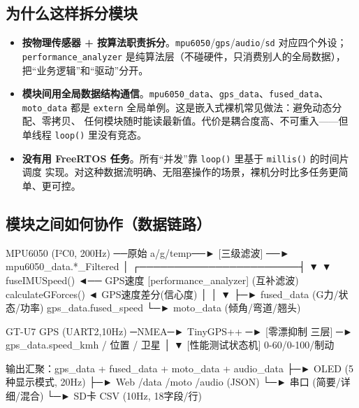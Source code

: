 \documentclass[UTF8,11pt,a4paper]{ctexart}
\begin{document}
\subsection{为什么这样拆分模块}
\begin{itemize}
  \item \textbf{按物理传感器 + 按算法职责拆分}。\texttt{mpu6050}/\texttt{gps}/\texttt{audio}/\texttt{sd}
        对应四个外设；\texttt{performance\_analyzer} 是纯算法层（不碰硬件，只消费别人的全局数据），
        把“业务逻辑”和“驱动”分开。
  \item \textbf{模块间用全局数据结构通信}。\texttt{mpu6050\_data}、\texttt{gps\_data}、\texttt{fused\_data}、
        \texttt{moto\_data} 都是 \texttt{extern} 全局单例。这是嵌入式裸机常见做法：避免动态分配、零拷贝、
        任何模块随时能读最新值。代价是耦合度高、不可重入——但单线程 \texttt{loop()} 里没有竞态。
  \item \textbf{没有用 FreeRTOS 任务}。所有“并发”靠 \texttt{loop()} 里基于 \texttt{millis()} 的时间片调度
        实现。对这种数据流明确、无阻塞操作的场景，裸机分时比多任务更简单、更可控。
\end{itemize}

\subsection{模块之间如何协作（数据链路）}
\begin{ascii}
MPU6050 (I²C0, 200Hz) ──原始 a/g/temp──► [三级滤波] ──► mpu6050_data.*_Filtered
                                                          │
                                  ┌───────────────────────┤
                                  ▼                        ▼
              fuseIMUSpeed() ◄── GPS速度          [performance_analyzer]
              (互补滤波)                           calculateGForces() ◄ GPS速度差分(信心度)
                  │                                    │
                  ▼                                    ├─► fused_data (G力/状态/功率)
          gps_data.fused_speed                         └─► moto_data  (倾角/弯道/翘头)

GT-U7 GPS (UART2,10Hz) ─NMEA─► TinyGPS++ ─► [零漂抑制 三层] ─► gps_data.speed_kmh / 位置 / 卫星
                                                              │
                                                              ▼  [性能测试状态机] 0-60/0-100/制动

输出汇聚：gps_data + fused_data + moto_data + audio_data
   ├─► OLED (5种显示模式, 20Hz)      ├─► Web /data /moto /audio (JSON)
   └─► 串口 (简要/详细/混合)          └─► SD卡 CSV (10Hz, 18字段/行)
\end{ascii}
\end{document}
